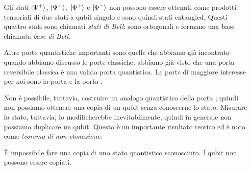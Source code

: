 Gli stati $\Ket{\Psi^+}$, $\Ket{\Psi^-}$, $\Ket{\Phi^+}$ e $\Ket{\Phi^-}$ non possono essere ottenuti come prodotti tensoriali di due stati a qubit singolo e sono quindi stati entangled. Questi quattro stati sono chiamati \emph{stati di Bell}; sono ortogonali e formano una base chiamata \emph{base di Bell}.

Altre porte quantistiche importanti sono quelle che abbiamo già incontrato quando abbiamo discusso le porte classiche; abbiamo già visto che una porta reversibile classica è una valida porta quantistica. Le porte di maggiore interesse per noi sono la porta  e la porta .

Non è possibile, tuttavia, costruire un analogo quantistico della porta ; quindi non possiamo ottenere una copia di un qubit senza conoscerne lo stato. Misurare lo stato, tuttavia, lo modificherebbe inevitabilmente, quindi in generale non possiamo duplicare un qubit. Questo è un importante risultato teorico ed è noto come \emph{teorema di non-clonazione}:
\begin{theorem}
	È impossibile fare una copia di uno stato quantistico sconosciuto. I qubit non possono essere copiati.
\end{theorem}

